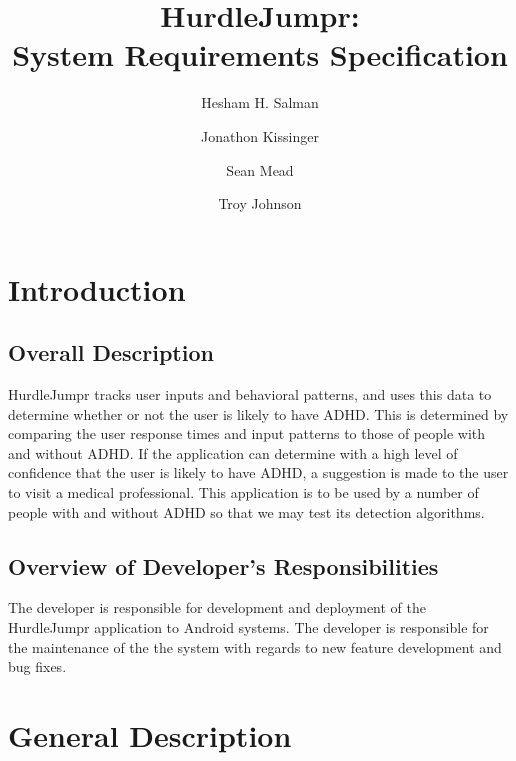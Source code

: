 \documentclass[a4wide]{article}
\title{HurdleJumpr:\\ System Requirements Specification}
\author{Hesham H. Salman \and Jonathon Kissinger \and Sean Mead
\and Troy Johnson}
\begin{document}
\maketitle

\section{Introduction}

\subsection{Overall Description}

HurdleJumpr tracks user inputs and behavioral patterns, and uses this data to
determine whether or not the user is likely to have ADHD. This is determined by
comparing the user response times and input patterns to those of people with and
without ADHD. If the application can determine with a high level of confidence
that the user is likely to have ADHD, a suggestion is made to the user to visit
a medical professional. \newline \newline
This application is to be used by a number of people with and without ADHD so
that we may test its detection algorithms.

%
%
%

\subsection{Overview of Developer's Responsibilities}

The developer is responsible for development and deployment of the HurdleJumpr
application to Android systems. The developer is responsible for the maintenance
of the the system with regards to new feature development and bug fixes.


\section{General Description}
\end{document}
